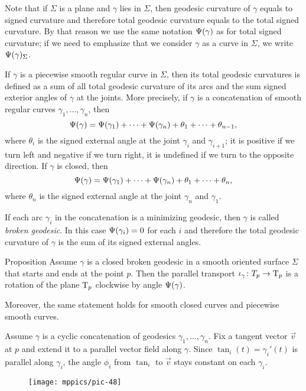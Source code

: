 Note that if $\Sigma$ is a plane and $\gamma$ lies in $\Sigma$, then geodesic curvature of $\gamma$ equals to signed curvature and therefore total geodesic curvature equals to the total signed curvature.
By that reason we use the same notation $\Psi({\gamma})$ as for total signed curvature; if we need to emphasize that we consider $\gamma$ as a curve in $\Sigma$, we write $\Psi({\gamma})_\Sigma$.

If $\gamma$ is a piecewise smooth regular curve in $\Sigma$, then
its total geodesic curvatures is defined as a sum of all total geodesic curvature of its arcs and the sum signed exterior angles of $\gamma$ at the joints.
More precisely, if $\gamma$ is a concatenation of smooth regular curves $\gamma_1,\dots,\gamma_n$, then
\[\Psi({\gamma})=\Psi({\gamma_1})+\dots+\Psi({\gamma_n})+\theta_1+\dots+\theta_{n-1},\]
where $\theta_i$ is the signed external angle at the joint $\gamma_i$ and $\gamma_{i+1}$; it is positive if we turn left and negative if we turn right, it is undefined if we turn to the opposite direction.
If $\gamma$ is closed, then 
\[\Psi({\gamma})=\Psi({\gamma_1})+\dots+\Psi({\gamma_n})+\theta_1+\dots+\theta_{n},\]
where $\theta_n$ is the signed external angle at the joint $\gamma_n$ and $\gamma_1$.

If each arc $\gamma_i$ in the concatenation is a minimizing geodesic, then $\gamma$ is called \emph{broken geodesic}.
In this case $\Psi({\gamma_i})=0$ for each $i$ and therefore the total geodesic curvature of $\gamma$ is the sum of its signed external angles.

\begin{thm}{Proposition}\label{prop:pt+tgc}
Assume $\gamma$ is a closed broken geodesic in a smooth oriented surface $\Sigma$ that starts and ends at the point $p$.
Then the parallel transport $\iota_\gamma\colon T_p\to\mathrm{T}_p$ is a rotation of the plane $\mathrm{T}_p$ clockwise by angle $\Psi({\gamma})$.

Moreover, the same statement holds for smooth closed curves and piecewise smooth curves.
\end{thm}

Assume $\gamma$ is a cyclic concatenation of geodesics $\gamma_1,\dots,\gamma_n$.
Fix a tangent vector ${\vec v}$ at $p$ and extend it to a parallel vector field along $\gamma$.
Since $\tan_i(t)=\gamma_i'(t)$ is parallel along $\gamma_i$, the angle $\phi_i$ from $\tan_i$ to ${\vec v}$ stays constant on each $\gamma_i$.

\begin{wrapfigure}{o}{22 mm}
\vskip-0mm
\centering
\texttt{[image: mppics/pic-48]}
\vskip-0mm
\end{wrapfigure}

